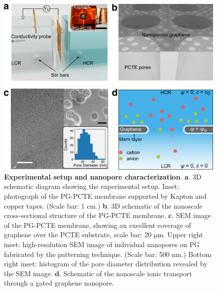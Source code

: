 \documentclass[journal=nalefd,email=true, hyperref=true, keywords=false]{achemso}
\begin{document}
\begin{figure}[H]
  \centering
  \includegraphics[width=0.95\linewidth]{img/fig1.pdf}
  \caption{\textbf{Experimental setup and nanopore characterization}.
    \textbf{a}. 3D schematic diagram showing the experimental
    setup. Inset: photograph of the PG-PCTE membrane supported by
    Kapton and copper tapes. (Scale bar: 1 cm.) \textbf{b}. 3D schematic
    of the nanoscale cross-sectional structure of the PG-PCTE
    membrane. \textbf{c}. SEM image of the PG-PCTE membrane, showing an
    excellent coverage of graphene over the PCTE substrate, scale bar:
    20 $\mathrm{\mu}$m.  Upper right inset: high-resolution SEM image
    of individual nanopores on PG fabricated by the patterning
    technique. (Scale bar: 500 nm.) Bottom right inset: histogram of the
    pore diameter distribution revealed by the SEM
    image. \textbf{d}. Schematic of the nanoscale ionic transport
    through a gated graphene nanopore.}
  \label{fig:1}
\end{figure}
\end{document}
